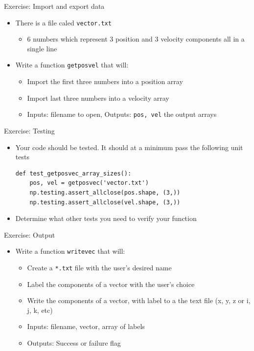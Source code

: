 \documentclass[11pt,professionalfonts]{beamer}
\begin{document}
\begin{frame}{Exercise: Import and export data}
    \begin{itemize}
        \item There is a file caled \texttt{vector.txt} 
            \begin{itemize}
                \item 6 numbers which represent 3 position and 3 velocity components all in a single line
            \end{itemize}
        \item Write a function \texttt{getposvel} that will:
            \begin{itemize}
                \item Import the first three numbers into a position array
                \item Import last three numbers into a velocity array
                \item Inputs: filename to open, Outputs: \texttt{pos, vel} the output arrays
            \end{itemize}
    \end{itemize}
\end{frame}

\begin{frame}[fragile]{Exercise: Testing}
    \begin{itemize}
        \item Your code should be tested. 
            It should at a minimum pass the following unit tests
    \begin{verbatim}
def test_getposvec_array_sizes():
    pos, vel = getposvec('vector.txt')
    np.testing.assert_allclose(pos.shape, (3,))
    np.testing.assert_allclose(vel.shape, (3,))
    \end{verbatim}
    \item Determine what other tests you need to verify your function
    \end{itemize}
\end{frame}

\begin{frame}{Exercise: Output}
    \begin{itemize}
        \item Write a function \texttt{writevec} that will:
            \begin{itemize}
                \item Create a \texttt{*.txt} file with the user's desired name
                \item Label the components of a vector with the user's choice 
                \item Write the components of a vector, with label to a the text file (x, y, z or i, j, k, etc)
                \item Inputs: filename, vector, array of labels
                \item Outputs: Success or failure flag
            \end{itemize}
    \end{itemize}
\end{frame}
\end{document}
